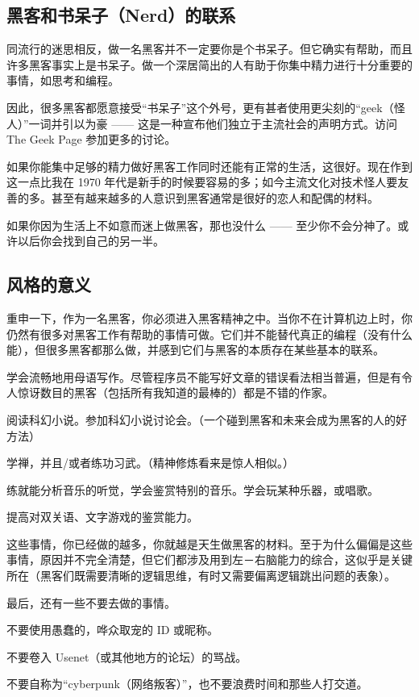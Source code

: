 \subsection{黑客和书呆子（Nerd）的联系}
同流行的迷思相反，做一名黑客并不一定要你是个书呆子。但它确实有帮助，而且许多黑客事实上是书呆子。做一个深居简出的人有助于你集中精力进行十分重要的事情，如思考和编程。

因此，很多黑客都愿意接受“书呆子”这个外号，更有甚者使用更尖刻的“geek（怪人）”一词并引以为豪 —— 这是一种宣布他们独立于主流社会的声明方式。访问 The Geek Page 参加更多的讨论。

如果你能集中足够的精力做好黑客工作同时还能有正常的生活，这很好。现在作到这一点比我在 1970 年代是新手的时候要容易的多；如今主流文化对技术怪人要友善的多。甚至有越来越多的人意识到黑客通常是很好的恋人和配偶的材料。

如果你因为生活上不如意而迷上做黑客，那也没什么 —— 至少你不会分神了。或许以后你会找到自己的另一半。


\subsection{风格的意义}
重申一下，作为一名黑客，你必须进入黑客精神之中。当你不在计算机边上时，你仍然有很多对黑客工作有帮助的事情可做。它们并不能替代真正的编程（没有什么能），但很多黑客都那么做，并感到它们与黑客的本质存在某些基本的联系。


学会流畅地用母语写作。尽管程序员不能写好文章的错误看法相当普遍，但是有令人惊讶数目的黑客（包括所有我知道的最棒的）都是不错的作家。

阅读科幻小说。参加科幻小说讨论会。（一个碰到黑客和未来会成为黑客的人的好方法）

学禅，并且/或者练功习武。（精神修炼看来是惊人相似。）

练就能分析音乐的听觉，学会鉴赏特别的音乐。学会玩某种乐器，或唱歌。

提高对双关语、文字游戏的鉴赏能力。

这些事情，你已经做的越多，你就越是天生做黑客的材料。至于为什么偏偏是这些事情，原因并不完全清楚，但它们都涉及用到左－右脑能力的综合，这似乎是关键所在（黑客们既需要清晰的逻辑思维，有时又需要偏离逻辑跳出问题的表象）。

最后，还有一些不要去做的事情。


不要使用愚蠢的，哗众取宠的 ID 或昵称。

不要卷入 Usenet（或其他地方的论坛）的骂战。

不要自称为“cyberpunk（网络叛客）”，也不要浪费时间和那些人打交道。

